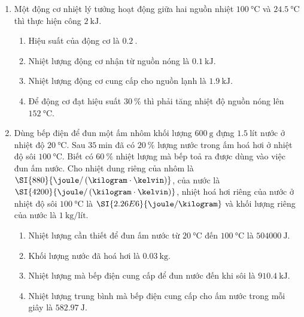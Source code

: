 \begin{enumerate}[label=\bfseries Câu \arabic*:, leftmargin=1.7cm]
\item Một động cơ nhiệt lý tưởng hoạt động giữa hai nguồn nhiệt $\SI{100}{\celsius}$ và $\SI{24.5}{\celsius}$ thì thực hiện công $\SI{2}{\kilo\joule}$.
\begin{enumerate}[label=\alph*)]
	\item Hiệu suất của động cơ là $\SI{0.2}{}$.
	\item Nhiệt lượng động cơ nhận từ nguồn nóng là $\SI{0.1}{\kilo\joule}$.
\item Nhiệt lượng động cơ cung cấp cho nguồn lạnh là $\SI{1.9}{\kilo\joule}$.
	\item Để động cơ đạt hiệu suất $\SI{30}{\percent}$ thì phải tăng nhiệt độ nguồn nóng lên $\SI{152}{\celsius}$.
\end{enumerate}
	
	
	\item Dùng bếp điện để đun một ấm nhôm khối lượng $\SI{600}{\gram}$ đựng $\SI{1.5}{\text{lít}}$ nước ở nhiệt độ $\SI{20}{\celsius}$. Sau $\SI{35}{\minute}$ đã có $\SI{20}{\percent}$ lượng nước trong ấm hoá hơi ở nhiệt độ sôi $\SI{100}{\celsius}$. Biết có $\SI{60}{\percent}$ nhiệt lượng mà bếp toả ra được dùng vào việc đun ấm nước. Cho nhiệt dung riêng của nhôm là $\SI{880}{\joule/\left(\kilogram\cdot\kelvin\right)}$, của nước là $\SI{4200}{\joule/\left(\kilogram\cdot\kelvin\right)}$, nhiệt hoá hơi riêng của nước ở nhiệt độ sôi $\SI{100}{\celsius}$ là $\SI{2.26E6}{\joule/\kilogram}$ và khối lượng riêng của nước là $\SI{1}{\kilogram/\text{lít}}$.
	\begin{enumerate}[label=\alph*)]
		\item Nhiệt lượng cần thiết để đun ấm nước từ $\SI{20}{\celsius}$ đến $\SI{100}{\celsius}$ là $\SI{504000}{\joule}$.
		\item Khối lượng nước đã hoá hơi là $\SI{0.03}{\kilogram}$.
		\item Nhiệt lượng mà bếp điện cung cấp để đun nước đến khi sôi là $\SI{910.4}{\kilo\joule}$.
		\item Nhiệt lượng trung bình mà bếp điện cung cấp cho ấm nước trong mỗi giây là $\SI{582.97}{\joule}$.
	\end{enumerate}
\end{enumerate}
